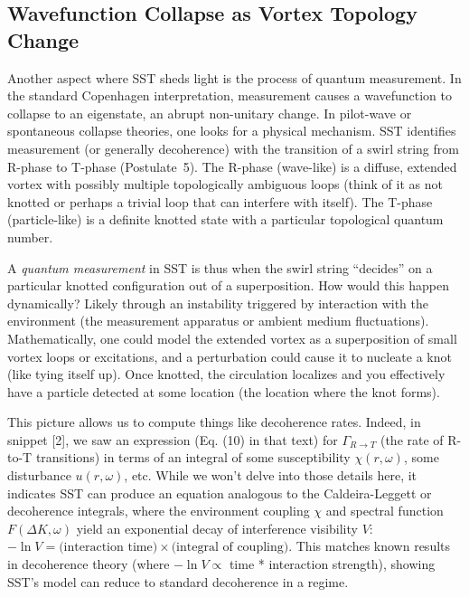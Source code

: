 \documentclass[10pt,reprint,aps,onecolumn,nofootinbib]{revtex4-2}
\begin{document}
\subsection{Wavefunction Collapse as Vortex Topology Change}

Another aspect where SST sheds light is the process of quantum measurement. In the standard Copenhagen interpretation, measurement causes a wavefunction to collapse to an eigenstate, an abrupt non-unitary change. In pilot-wave or spontaneous collapse theories, one looks for a physical mechanism. SST identifies measurement (or generally decoherence) with the transition of a swirl string from R-phase to T-phase (Postulate~5). The R-phase (wave-like) is a diffuse, extended vortex with possibly multiple topologically ambiguous loops (think of it as not knotted or perhaps a trivial loop that can interfere with itself). The T-phase (particle-like) is a definite knotted state with a particular topological quantum number.


A \emph{quantum measurement} in SST is thus when the swirl string “decides” on a particular knotted configuration out of a superposition. How would this happen dynamically? Likely through an instability triggered by interaction with the environment (the measurement apparatus or ambient medium fluctuations). Mathematically, one could model the extended vortex as a superposition of small vortex loops or excitations, and a perturbation could cause it to nucleate a knot (like tying itself up). Once knotted, the circulation localizes and you effectively have a particle detected at some location (the location where the knot forms).


This picture allows us to compute things like decoherence rates. Indeed, in snippet [2], we saw an expression (Eq. (10) in that text) for $\Gamma_{R\to T}$ (the rate of R-to-T transitions) in terms of an integral of some susceptibility $\chi(r,\omega)$, some disturbance $u(r,\omega)$, etc. While we won’t delve into those details here, it indicates SST can produce an equation analogous to the Caldeira-Leggett or decoherence integrals, where the environment coupling $\chi$ and spectral function $F(\Delta K,\omega)$ yield an exponential decay of interference visibility $V$: $-\ln V = \text{(interaction time)} \times \text{(integral of coupling)}$. This matches known results in decoherence theory (where $-\ln V \propto$ time * interaction strength), showing SST’s model can reduce to standard decoherence in a regime.
\end{document}
